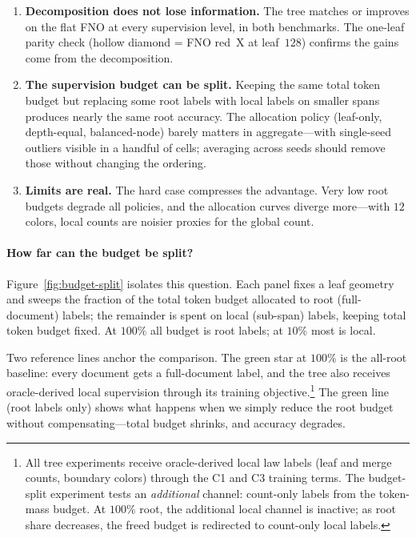 \begin{enumerate}[leftmargin=1.5em]
    \item \textbf{Decomposition does not lose information.} The tree matches or improves on the flat FNO at every supervision level, in both benchmarks. The one-leaf parity check (hollow diamond = FNO red~X at leaf~$128$) confirms the gains come from the decomposition.
    \item \textbf{The supervision budget can be split.} Keeping the same total token budget but replacing some root labels with local labels on smaller spans produces nearly the same root accuracy. The allocation policy (leaf-only, depth-equal, balanced-node) barely matters in aggregate---with single-seed outliers visible in a handful of cells; averaging across seeds should remove those without changing the ordering.
    \item \textbf{Limits are real.} The hard case compresses the advantage. Very low root budgets degrade all policies, and the allocation curves diverge more---with $12$ colors, local counts are noisier proxies for the global count.
\end{enumerate}

\paragraph{How far can the budget be split?}
Figure~\ref{fig:budget-split} isolates this question. Each panel fixes a leaf geometry and sweeps the fraction of the total token budget allocated to root (full-document) labels; the remainder is spent on local (sub-span) labels, keeping total token budget fixed. At $100\%$ all budget is root labels; at $10\%$ most is local.

Two reference lines anchor the comparison. The green star at $100\%$ is the all-root baseline: every document gets a full-document label, and the tree also receives oracle-derived local supervision through its training objective.\footnote{All tree experiments receive oracle-derived local law labels (leaf and merge counts, boundary colors) through the C1 and C3 training terms. The budget-split experiment tests an \emph{additional} channel: count-only labels from the token-mass budget. At $100\%$ root, the additional local channel is inactive; as root share decreases, the freed budget is redirected to count-only local labels.} The green line (root labels only) shows what happens when we simply reduce the root budget without compensating---total budget shrinks, and accuracy degrades.

